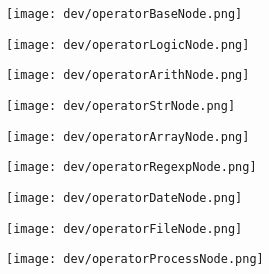 \begin{multicols}{2}
\begin{center}
\texttt{[image: dev/operatorBaseNode.png]} 
\end{center}
\begin{center}

\texttt{[image: dev/operatorLogicNode.png]} 
\end{center}
\end{multicols}

\begin{multicols}{2}
\begin{center}
\texttt{[image: dev/operatorArithNode.png]} 
\end{center}
\begin{center}

\texttt{[image: dev/operatorStrNode.png]} 
\end{center}
\end{multicols}

\begin{multicols}{2}
\begin{center}
\texttt{[image: dev/operatorArrayNode.png]} 
\end{center}
\begin{center}

\texttt{[image: dev/operatorRegexpNode.png]} 
\end{center}
\end{multicols}

\begin{multicols}{2}
\begin{center}
\texttt{[image: dev/operatorDateNode.png]} 
\end{center}
\begin{center}
\texttt{[image: dev/operatorFileNode.png]} 
\end{center}
\end{multicols}


\begin{center}
\texttt{[image: dev/operatorProcessNode.png]} 
\end{center}

